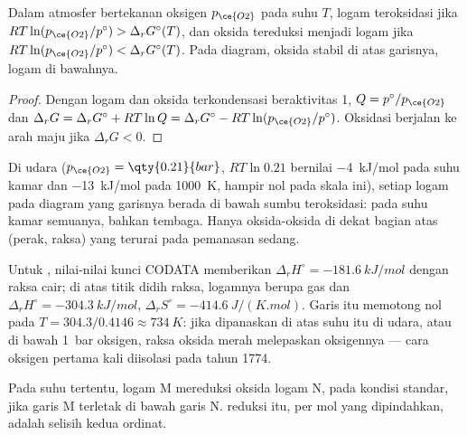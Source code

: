 \begin{theorem}\label{thm:b2:ellingham:domains}
Dalam atmosfer bertekanan oksigen $p_{\ce{O2}}$ pada suhu $T$, logam
teroksidasi jika $RT\ln(p_{\ce{O2}}/p^\circ) > \Delta_r G^\circ(T)$, dan
oksida tereduksi menjadi logam jika $RT\ln(p_{\ce{O2}}/p^\circ) < \Delta_r
G^\circ(T)$. Pada diagram, oksida stabil di atas garisnya, logam di
bawahnya.
\end{theorem}

\begin{proof}
Dengan logam dan oksida terkondensasi beraktivitas 1, $Q = p^\circ/p_{\ce{O2}}$
dan $\Delta_r G = \Delta_r G^\circ + RT\ln Q = \Delta_r G^\circ - RT\ln(p_{\ce{O2}}/
p^\circ)$. Oksidasi berjalan ke arah maju jika $\Delta_r G < 0$.
\end{proof}

Di udara ($p_{\ce{O2}} = \qty{0.21}{bar}$, $RT\ln 0.21$ bernilai
\qty{-4}{kJ/mol} pada suhu kamar dan \qty{-13}{kJ/mol} pada
\qty{1000}{K}, hampir nol pada skala ini), setiap logam pada diagram yang
garisnya berada di bawah sumbu teroksidasi: pada suhu kamar semuanya,
bahkan tembaga. Hanya oksida-oksida di dekat bagian atas (perak, raksa)
yang terurai pada pemanasan sedang.

\begin{example}\label{ex:b2:ellingham:hgo}
Untuk , nilai-nilai kunci CODATA memberikan
$\Delta_r H^\circ =
\qty{-181.6}{kJ/mol}$ dengan raksa cair; di atas titik
didih raksa, logamnya berupa gas dan $\Delta_r H^\circ = \qty{-304.3}{kJ/mol}$, $\Delta_r
S^\circ = \qty{-414.6}{J/(K.mol)}$. Garis
itu memotong nol pada $T = 304.3/0.4146 \approx \qty{734}{K}$: jika
dipanaskan di atas suhu itu di udara, atau di bawah \qty{1}{bar} oksigen,
raksa oksida merah melepaskan oksigennya --- cara oksigen pertama kali
diisolasi pada tahun 1774.
\end{example}

\begin{proposition}\label{prop:b2:ellingham:reduction}
Pada suhu tertentu, logam M mereduksi oksida logam N, pada kondisi
standar, jika garis M terletak di bawah garis N.  reduksi itu, per mol  yang dipindahkan, adalah selisih
kedua ordinat.
\end{proposition}

